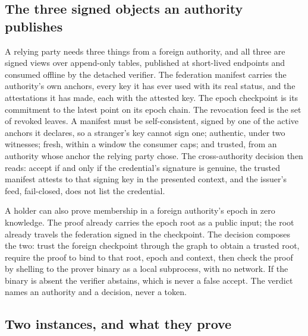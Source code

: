 
\subsection{The three signed objects an authority publishes}

A relying party needs three things from a foreign authority, and all three are signed views over
append-only tables, published at short-lived endpoints and consumed offline by the detached
verifier. The federation manifest carries the authority's own anchors, every key it has ever used
with its real status, and the attestations it has made, each with the attested key. The epoch
checkpoint is its commitment to the latest point on its epoch chain. The revocation feed is the set
of revoked leaves. A manifest must be self-consistent, signed by one of the active anchors it
declares, so a stranger's key cannot sign one; authentic, under two witnesses; fresh, within a window
the consumer caps; and trusted, from an authority whose anchor the relying party chose. The
cross-authority decision then reads: accept if and only if the credential's signature is genuine,
the trusted manifest attests to that signing key in the presented context, and the issuer's feed,
fail-closed, does not list the credential. \sImpl

A holder can also prove membership in a foreign authority's epoch in zero knowledge. The proof
already carries the epoch root as a public input; the root already travels the federation signed in
the checkpoint. The decision composes the two: trust the foreign checkpoint through the graph to
obtain a trusted root, require the proof to bind to that root, epoch and context, then check the
proof by shelling to the prover binary as a local subprocess, with no network. If the binary is
absent the verifier abstains, which is never a false accept. The verdict names an authority and a
decision, never a token. \sImpl

\subsection{Two instances, and what they prove}

